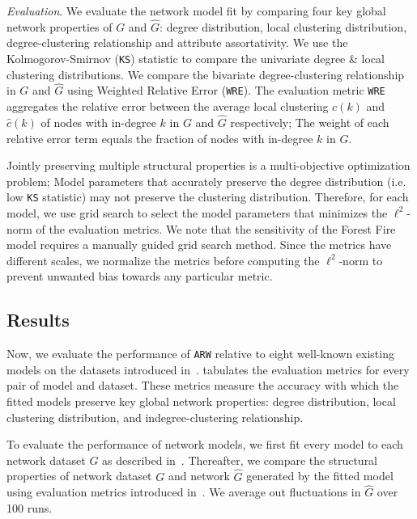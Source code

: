 \textit{Evaluation}.
We evaluate the network model fit by comparing four key global network properties of ${G}$ and $\hat{G}$:
degree distribution, local clustering distribution, degree-clustering relationship
and attribute assortativity. We use the Kolmogorov-Smirnov (\texttt{KS}) statistic to compare the univariate degree
\& local clustering distributions. We compare the bivariate degree-clustering relationship in $G$ and $\hat{G}$ using
Weighted Relative Error (\texttt{WRE}). The evaluation metric \texttt{WRE} aggregates the relative error
between the average local clustering $c(k)$ and $\hat{c}(k)$ of nodes  with in-degree $k$
in $G$ and $\hat{G}$ respectively; The weight of each relative error term equals the fraction
of nodes with in-degree $k$ in $G$.

Jointly preserving multiple structural properties is a multi-objective optimization
problem; Model parameters that accurately preserve the degree distribution
(i.e. low \texttt{KS} statistic) may not preserve the clustering distribution.
Therefore, for each model, we use grid search to select the model parameters
that minimizes the $\ell^2$-norm of the evaluation metrics.
We note that the sensitivity of the Forest Fire model requires a manually guided grid search method.
Since the metrics have different scales, we normalize the metrics before computing the $\ell^2$-norm
to prevent unwanted bias towards any particular metric.

\subsection{Results}
\label{sub:Experimental Results}

Now, we evaluate the performance of \texttt{ARW} relative to eight well-known
existing models on the datasets introduced in~.
 tabulates the evaluation metrics for every pair of model
and dataset. These metrics measure the accuracy with which the fitted models
preserve key global network properties: degree distribution, local clustering distribution,
and indegree-clustering relationship.

To evaluate the performance of network models, we first fit every model
to each network dataset $G$ as described in~.
Thereafter, we compare the structural properties of network dataset $G$ and network $\hat{G}$
generated by the fitted model using evaluation metrics introduced in~. We average out
fluctuations in $\hat{G}$ over 100 runs.

